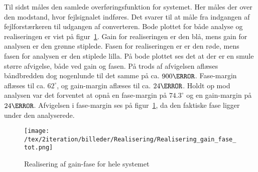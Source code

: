Til sidst måles den samlede overføringsfunktion for systemet. Her måles der over den modstand, hvor fejlsignalet indføres. Det svarer til at måle fra indgangen af fejlforstærkeren til udgangen af converteren. Bode plottet for både analyse og realiseringen er vist på figur~\ref{fig:realisering_gain_fase_tot}. Gain for realiseringen er den blå, mens gain for analysen er den grønne stiplede. Fasen for realiseringen er er den røde, mens fasen for analysen er den stiplede lilla. På bode plottet ses det at der er en smule større afvigelse, både ved gain og fasen. På trods af afvigelsen aflæses båndbredden dog nogenlunde til det samme på ca. $900\hertz$. Fase-margin aflæses til ca. $62^\circ$, og gain-margin aflæses til ca. $24\decibel$. Holdt op mod analysen var det forventet at opnå en fase-margin på $74.3^\circ$ og en gain-margin på $24\decibel$. Afvigelsen i fase-margin ses på figur~\ref{fig:realisering_gain_fase_tot}, da den faktiske fase ligger under den analyserede. 

\begin{figure}[H]
	\center
	\texttt{[image: /tex/2iteration/billeder/Realisering/Realisering\_gain\_fase\_tot.png]}
	\caption{Realisering af gain-fase for hele systemet}
	\label{fig:realisering_gain_fase_tot}
\end{figure}
















